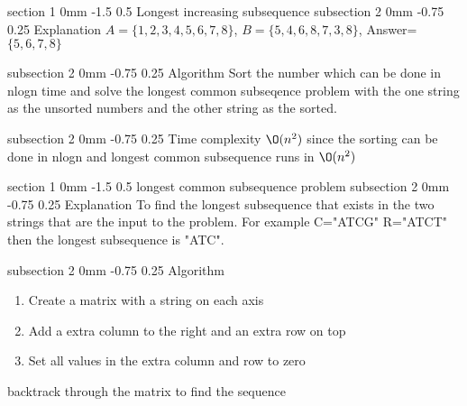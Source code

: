 \documentclass[a4paper,11pt]{article}
\makeatletter
\renewcommand{\section}{\@startsection
   {section}%
   {1}%
   {0mm}%
   {-1.5\baselineskip}%
   {0.5\baselineskip}%
   {\sffamily\bfseries\upshape\normalsize}}%
\renewcommand{\subsection}{\@startsection
   {subsection}%
   {2}%
   {0mm}%
   {-0.75\baselineskip}%
   {0.25\baselineskip}%
   {\rmfamily\normalfont\slshape\normalsize}}%
\makeatother
\begin{document}
\section{Longest increasing subsequence}
\subsection{Explanation}
$A=\{1,2,3,4,5,6,7,8\}$, $B=\{5,4,6,8,7,3,8\}$, Answer= $\{5,6,7,8\}$ 

\subsection{Algorithm}
Sort the number which can be done in nlogn time and solve the longest common subseqence problem with the one string as the unsorted numbers and the other string as the sorted.

\subsection{Time complexity}
$\O(n^2)$ since the sorting can be done in nlogn and longest common subsequence runs in $\O(n^2)$

\section{longest common subsequence problem}
\subsection{Explanation}
To find the longest subsequence that exists in the two strings that are the input to the problem. For example C="ATCG" R="ATCT" then the longest subsequence is "ATC". 

\subsection{Algorithm}
\begin{enumerate}
\item Create a matrix with a string on each axis
\item Add a extra column to the right and an extra row on top
\item Set all values in the extra column and row to zero
\end{enumerate}
\begin{algorithm}
backtrack through the matrix to find the sequence\;
\end{algorithm}
\end{document}
